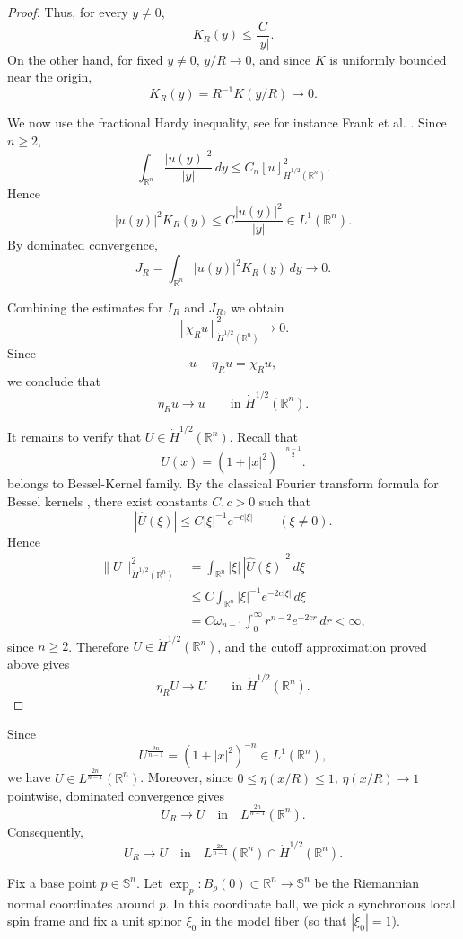\documentclass[a4paper, 12pt]{article}
\begin{document}
\begin{proof}
	Thus, for every \(y\neq0\),
	\[
	K_R(y)\le \frac{C}{|y|}.
	\]
	On the other hand, for fixed \(y\neq0\), \(y/R\to0\), and since \(K\) is
	uniformly bounded near the origin, 
	\[
	K_R(y)=R^{-1}K(y/R)\to0.
	\]
	
	We now use the fractional Hardy inequality, see for instance
	Frank et al. \cite{MR2425175}. Since $n\ge2$,
	\[
	\int_{\mathbb R^n}
	\frac{|u(y)|^2}{|y|}\,dy
	\le
	C_n [u]_{\dot H^{1/2}(\mathbb R^n)}^2.
	\]
	Hence
	\[
	|u(y)|^2K_R(y)
	\le
	C\frac{|u(y)|^2}{|y|}
	\in L^1(\mathbb R^n).
	\]
	By dominated convergence,
	\[
	J_R
	=
	\int_{\mathbb R^n}|u(y)|^2K_R(y)\,dy
	\to0.
	\]
	
	Combining the estimates for $I_R$ and $J_R$, we obtain
	\[
	[\chi_Ru]_{\dot H^{1/2}(\mathbb R^n)}^2\to0.
	\]
	Since
	\[
	u-\eta_Ru=\chi_Ru,
	\]
	we conclude that
	\[
	\eta_Ru\to u
	\qquad\text{in } \dot H^{1/2}(\mathbb R^n).
	\]
	
	It remains to verify that \(U\in \dot H^{1/2}(\mathbb R^n)\). 
	Recall that
	\[
	U(x)=(1+|x|^2)^{-\frac{n-1}{2}}.
	\]
	belongs to Bessel-Kernel family. By the classical Fourier transform formula for Bessel kernels \cite{MR304972}, there exist
	constants \(C,c>0\) such that
	\[
	|\widehat U(\xi)|\le C|\xi|^{-1}e^{-c|\xi|}
	\qquad (\xi\neq0).
	\]
	Hence
	\[
	\begin{aligned}
		\|U\|_{\dot H^{1/2}(\mathbb R^n)}^2
		&=
		\int_{\mathbb R^n}|\xi|\,|\widehat U(\xi)|^2\,d\xi  \\
		&\le
		C\int_{\mathbb R^n}|\xi|^{-1}e^{-2c|\xi|}\,d\xi  \\
		&=
		C\omega_{n-1}\int_0^\infty r^{n-2}e^{-2cr}\,dr
		<\infty,
	\end{aligned}
	\]
	since \(n\ge2\). Therefore \(U\in\dot H^{1/2}(\mathbb R^n)\), and the cutoff
	approximation proved above gives
	\[
	\eta_RU\to U
	\qquad\text{in } \dot H^{1/2}(\mathbb R^n).
	\]
\end{proof}

Since
\[
U^{\frac{2n}{n-1}}=(1+|x|^2)^{-n}\in L^1(\mathbb R^n),
\]
we have \(U\in L^{\frac{2n}{n-1}}(\mathbb R^n)\). Moreover, since \(0\le\eta(x/R)\le1\), \(\eta(x/R)\to1\) pointwise, dominated convergence gives
\[
U_R\to U
\quad\text{in}\quad
L^{\frac{2n}{n-1}}(\mathbb R^n).
\]
Consequently,
\[
U_R\to U
\quad\text{in}\quad
L^{\frac{2n}{n-1}}(\mathbb R^n)\cap \dot H^{1/2}(\mathbb R^n).
\]

Fix a base point $p \in \mathbb{S}^n$. Let $\exp_p: B_\rho(0) \subset \mathbb{R}^n \to \mathbb{S}^n$ be the Riemannian normal coordinates around $p$. In this coordinate ball, we pick a synchronous local spin frame and fix a unit spinor $\xi_0$ in the model fiber (so that $|\xi_0|=1$).
\end{document}
